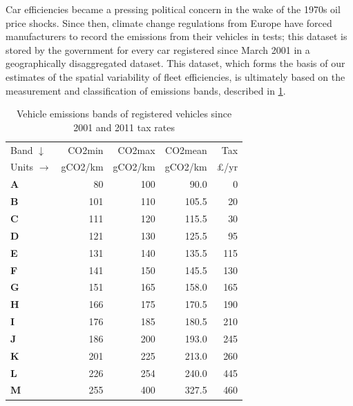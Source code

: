 \documentclass[a4paper, 11pt, twoside]{Thesis}
\begin{document}
\label{semdata}
Car efficiencies became a pressing political concern in the wake of the 1970s
oil price shocks. Since then, climate change regulations from Europe have
forced manufacturers to record the emissions from their vehicles in tests;
this dataset is stored by the government for every car registered since March
2001 in a geographically disaggregated dataset. This dataset, which forms the
basis of our estimates of the spatial variability of fleet efficiencies,
is ultimately based on the measurement and classification of emissions bands,
described in \cref{ttaxrate}.

\begin{table}[htbp]
\caption[Vehicle emissions bands of registered vehicles since 2001]
{Vehicle emissions bands of registered vehicles since 2001 and 2011 tax rates}
\begin{center}
\begin{tabular}{lrrrr}
\toprule
Band $\downarrow$ & CO2min & CO2max & CO2mean & Tax \\
Units $\rightarrow$ & gCO2/km & gCO2/km & gCO2/km & £/yr \\
\midrule
\textbf{A} & 80 & 100 & 90.0 & 0 \\
\textbf{B} & 101 & 110 & 105.5 & 20 \\
\textbf{C} & 111 & 120 & 115.5 & 30 \\
\textbf{D} & 121 & 130 & 125.5 & 95 \\
\textbf{E} & 131 & 140 & 135.5 & 115 \\
\textbf{F} & 141 & 150 & 145.5 & 130 \\
\textbf{G} & 151 & 165 & 158.0 & 165 \\
\textbf{H} & 166 & 175 & 170.5 & 190 \\
\textbf{I} & 176 & 185 & 180.5 & 210 \\
\textbf{J} & 186 & 200 & 193.0 & 245 \\
\textbf{K} & 201 & 225 & 213.0 & 260 \\
\textbf{L} & 226 & 254 & 240.0 & 445 \\
\textbf{M} & 255 & 400 & 327.5 & 460 \\
\bottomrule
\end{tabular}\end{center}
\label{ttaxrate}
\end{table}
\end{document}
